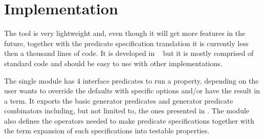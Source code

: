 
\section{Implementation}
\label{sec:impl}

The \plqc{} tool is very lightweight and, even though it will get more
features in the future, together with the predicate specification
translation it is currently less then a thousand lines of \Prolog{}
code.
%
It is developed in \Yap~\Prolog{} but it is mostly comprised of standard
\Prolog{} code and should be easy to use with other implementations.


The single \plqc{} module has 4 interface predicates to run a property,
depending on the user wants to override the defaults with specific
options and/or have the result in a term.
%
It exports the basic generator predicates and generator predicate
combinators including, but not limited to, the ones presented in
.
%
The module also defines the operators needed to make predicate
specifications together with the term expansion of such specifications
into testable properties.



